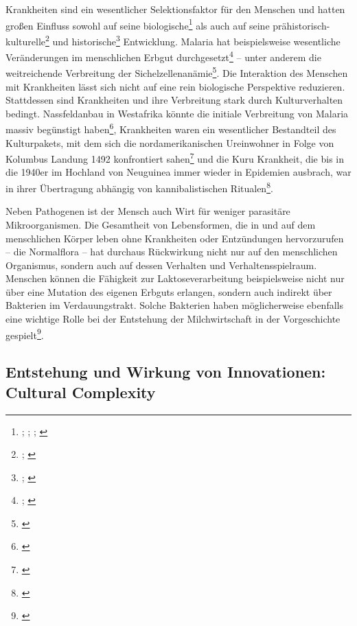 \documentclass[openany,twoside,twocolumn]{book}
\let\rmarkdownfootnote\footnote%
\def\footnote{\protect\rmarkdownfootnote}
\begin{document}
Krankheiten sind ein wesentlicher Selektionsfaktor für den Menschen und
hatten großen Einfluss sowohl auf seine biologische\footnote{\textcite{bustamante_natural_2005};
  \textcite{enard_viruses_2016}; \textcite{mead_balancing_2003};
  \textcite{sabeti_genome-wide_2007}} als auch auf seine
prähistorisch-kulturelle\footnote{\textcite{martin_health_2002};
  \textcite{oxenham_skeletal_2005}} und historische\footnote{\textcite{alfani_plague_2013};
  \textcite{murray_estimation_2006}} Entwicklung. Malaria hat
beispielsweise wesentliche Veränderungen im menschlichen Erbgut
durchgesetzt\footnote{\textcite{kwiatkowski_how_2005};
  \textcite{tishkoff_haplotype_2001}} -- unter anderem die weitreichende
Verbreitung der Sichelzellenanämie\footnote{\textcite{allison_protection_1954}}.
Die Interaktion des Menschen mit Krankheiten lässt sich nicht auf eine
rein biologische Perspektive reduzieren. Stattdessen sind Krankheiten
und ihre Verbreitung stark durch Kulturverhalten bedingt. Nassfeldanbau
in Westafrika könnte die initiale Verbreitung von Malaria massiv
begünstigt haben\footnote{\textcite{durham_coevolution_1991-1}},
Krankheiten waren ein wesentlicher Bestandteil des Kulturpakets, mit dem
sich die nordamerikanischen Ureinwohner in Folge von Kolumbus Landung
1492 konfrontiert sahen\footnote{\textcite{nunn_columbian_2010}} und die
Kuru Krankheit, die bis in die 1940er im Hochland von Neuguinea immer
wieder in Epidemien ausbrach, war in ihrer Übertragung abhängig von
kannibalistischen Ritualen\footnote{\textcite{lindenbaum_kuru_2015}}.

Neben Pathogenen ist der Mensch auch Wirt für weniger parasitäre
Mikroorganismen. Die Gesamtheit von Lebensformen, die in und auf dem
menschlichen Körper leben ohne Krankheiten oder Entzündungen
hervorzurufen -- die Normalflora -- hat durchaus Rückwirkung nicht nur
auf den menschlichen Organismus, sondern auch auf dessen Verhalten und
Verhaltensspielraum. Menschen können die Fähigkeit zur
Laktoseverarbeitung beispielsweise nicht nur über eine Mutation des
eigenen Erbguts erlangen, sondern auch indirekt über Bakterien im
Verdauungstrakt. Solche Bakterien haben möglicherweise ebenfalls eine
wichtige Rolle bei der Entstehung der Milchwirtschaft in der
Vorgeschichte gespielt\footnote{\textcite{walter_human_2011}}.

\hypertarget{cultural-complexity}{%
\subsection{Entstehung und Wirkung von Innovationen: Cultural
Complexity}\label{cultural-complexity}}
\end{document}
